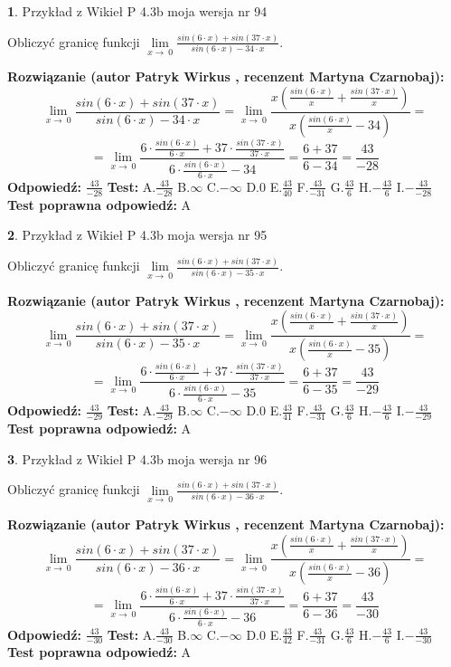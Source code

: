 \documentclass[12pt, a4paper]{article}
\theoremstyle{definition} %
\newtheorem{zad}{}
\newcommand{\zadStart}[1]{\begin{zad}#1\newline}
\newcommand{\zadStop}{\end{zad}}
\newcommand{\rozwStart}[2]{\noindent \textbf{Rozwiązanie (autor #1 , recenzent #2): }\newline}
\newcommand{\rozwStop}{\newline}
\newcommand{\odpStart}{\noindent \textbf{Odpowiedź:}\newline}
\newcommand{\odpStop}{\newline}
\newcommand{\testStart}{\noindent \textbf{Test:}\newline}
\newcommand{\testStop}{\newline}
\newcommand{\kluczStart}{\noindent \textbf{Test poprawna odpowiedź:}\newline}
\newcommand{\kluczStop}{\newline}
\begin{document}
\zadStart{Przykład z Wikieł P 4.3b moja wersja nr 94}


Obliczyć granicę funkcji $\lim\limits_{x\to\ 0}\frac{sin(6 \cdot x)+sin(37 \cdot x)}{sin(6 \cdot x)-34 \cdot x}$.
\zadStop
\rozwStart{Patryk Wirkus}{Martyna Czarnobaj}
$$\lim\limits_{x\to\ 0}\frac{sin(6 \cdot x)+sin(37 \cdot x)}{sin(6 \cdot x)-34 \cdot x}=\lim\limits_{x\to\ 0}\frac{x(\frac{sin(6 \cdot x)}{x}+\frac{sin(37 \cdot x)}{x})}{x(\frac{sin(6 \cdot x)}{x}-34)}=$$
$$=\lim\limits_{x\to\ 0}\frac{6 \cdot \frac{sin(6 \cdot x)}{6 \cdot x}+37 \cdot \frac{sin(37 \cdot x)}{37 \cdot x}}{6 \cdot \frac{sin(6 \cdot x)}{6 \cdot x}-34}=\frac{6+37}{6-34} = \frac{43}{-28}$$
\rozwStop
\odpStart
$\frac{43}{-28}$
\odpStop
\testStart
A.$\frac{43}{-28}$
B.$\infty$
C.$-\infty$
D.$0$
E.$\frac{43}{40}$
F.$\frac{43}{-31}$
G.$\frac{43}{6}$
H.$-\frac{43}{6}$
I.$-\frac{43}{-28}$
\testStop
\kluczStart
A
\kluczStop



\zadStart{Przykład z Wikieł P 4.3b moja wersja nr 95}


Obliczyć granicę funkcji $\lim\limits_{x\to\ 0}\frac{sin(6 \cdot x)+sin(37 \cdot x)}{sin(6 \cdot x)-35 \cdot x}$.
\zadStop
\rozwStart{Patryk Wirkus}{Martyna Czarnobaj}
$$\lim\limits_{x\to\ 0}\frac{sin(6 \cdot x)+sin(37 \cdot x)}{sin(6 \cdot x)-35 \cdot x}=\lim\limits_{x\to\ 0}\frac{x(\frac{sin(6 \cdot x)}{x}+\frac{sin(37 \cdot x)}{x})}{x(\frac{sin(6 \cdot x)}{x}-35)}=$$
$$=\lim\limits_{x\to\ 0}\frac{6 \cdot \frac{sin(6 \cdot x)}{6 \cdot x}+37 \cdot \frac{sin(37 \cdot x)}{37 \cdot x}}{6 \cdot \frac{sin(6 \cdot x)}{6 \cdot x}-35}=\frac{6+37}{6-35} = \frac{43}{-29}$$
\rozwStop
\odpStart
$\frac{43}{-29}$
\odpStop
\testStart
A.$\frac{43}{-29}$
B.$\infty$
C.$-\infty$
D.$0$
E.$\frac{43}{41}$
F.$\frac{43}{-31}$
G.$\frac{43}{6}$
H.$-\frac{43}{6}$
I.$-\frac{43}{-29}$
\testStop
\kluczStart
A
\kluczStop



\zadStart{Przykład z Wikieł P 4.3b moja wersja nr 96}


Obliczyć granicę funkcji $\lim\limits_{x\to\ 0}\frac{sin(6 \cdot x)+sin(37 \cdot x)}{sin(6 \cdot x)-36 \cdot x}$.
\zadStop
\rozwStart{Patryk Wirkus}{Martyna Czarnobaj}
$$\lim\limits_{x\to\ 0}\frac{sin(6 \cdot x)+sin(37 \cdot x)}{sin(6 \cdot x)-36 \cdot x}=\lim\limits_{x\to\ 0}\frac{x(\frac{sin(6 \cdot x)}{x}+\frac{sin(37 \cdot x)}{x})}{x(\frac{sin(6 \cdot x)}{x}-36)}=$$
$$=\lim\limits_{x\to\ 0}\frac{6 \cdot \frac{sin(6 \cdot x)}{6 \cdot x}+37 \cdot \frac{sin(37 \cdot x)}{37 \cdot x}}{6 \cdot \frac{sin(6 \cdot x)}{6 \cdot x}-36}=\frac{6+37}{6-36} = \frac{43}{-30}$$
\rozwStop
\odpStart
$\frac{43}{-30}$
\odpStop
\testStart
A.$\frac{43}{-30}$
B.$\infty$
C.$-\infty$
D.$0$
E.$\frac{43}{42}$
F.$\frac{43}{-31}$
G.$\frac{43}{6}$
H.$-\frac{43}{6}$
I.$-\frac{43}{-30}$
\testStop
\kluczStart
A
\kluczStop
\end{document}
